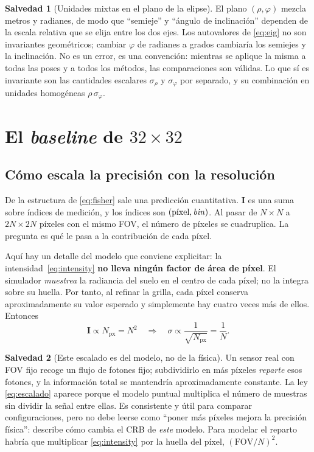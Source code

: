 \documentclass[11pt,a4paper]{article}
\newcommand{\matr}[1]{\mathbf{#1}}
\theoremstyle{definition}
\newtheorem{salvedad}{Salvedad}
\theoremstyle{plain}
\begin{document}
\begin{salvedad}[Unidades mixtas en el plano de la elipse]
\label{sal:unidades}
El plano $(\rho,\varphi)$ mezcla metros y radianes, de modo que
\enquote{semieje} y \enquote{ángulo de inclinación} dependen de la escala
relativa que se elija entre los dos ejes. Los autovalores de \eqref{eq:eig} no
son invariantes geométricos; cambiar $\varphi$ de radianes a grados cambiaría
los semiejes y la inclinación. No es un error, es una convención: mientras se
aplique la misma a todas las poses y a todos los métodos, las comparaciones son
válidas. Lo que sí es invariante son las cantidades escalares $\sigma_\rho$ y
$\sigma_\varphi$ por separado, y su combinación en unidades homogéneas
$\rho\,\sigma_\varphi$.
\end{salvedad}

\section{El \emph{baseline} de \texorpdfstring{$32\times32$}{32x32}}
\label{sec:baseline}

\subsection{Cómo escala la precisión con la resolución}

De la estructura de \eqref{eq:fisher} sale una predicción cuantitativa.
$\matr I$ es una suma sobre índices de medición, y los índices son
$(\text{píxel},\text{\emph{bin}})$. Al pasar de $N\times N$ a $2N\times2N$
píxeles con el mismo FOV, el número de píxeles se cuadruplica. La pregunta es
qué le pasa a la contribución de cada píxel.

Aquí hay un detalle del modelo que conviene explicitar: la
intensidad~\eqref{eq:intensity} \textbf{no lleva ningún factor de área de
píxel}. El simulador \emph{muestrea} la radiancia del suelo en el centro de cada
píxel; no la integra sobre su huella. Por tanto, al refinar la grilla, cada
píxel conserva aproximadamente su valor esperado y simplemente hay cuatro veces
más de ellos. Entonces
%
\begin{equation}
\label{eq:escalado}
\matr I \propto N_{\text{px}} = N^2
\quad\Longrightarrow\quad
\sigma \propto \frac{1}{\sqrt{N_{\text{px}}}} = \frac{1}{N} .
\end{equation}

\begin{salvedad}[Este escalado es del modelo, no de la física]
\label{sal:escalado}
Un sensor real con FOV fijo recoge un flujo de fotones fijo; subdividirlo en más
píxeles \emph{reparte} esos fotones, y la información total se mantendría
aproximadamente constante. La ley \eqref{eq:escalado} aparece porque el modelo
puntual multiplica el número de muestras sin dividir la señal entre ellas. Es
consistente y útil para comparar configuraciones, pero no debe leerse como
\enquote{poner más píxeles mejora la precisión física}: describe cómo cambia el
CRB de \emph{este} modelo. Para modelar el reparto habría que multiplicar
\eqref{eq:intensity} por la huella del píxel, $(\text{FOV}/N)^2$.
\end{salvedad}
\end{document}
